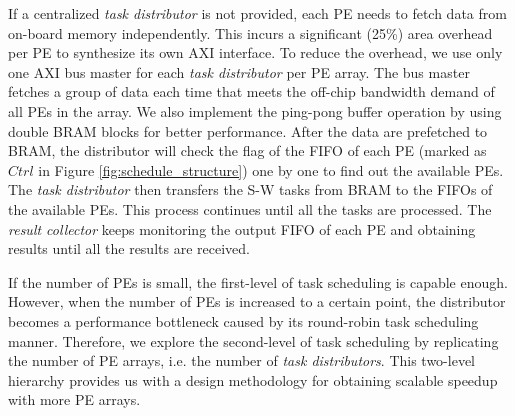 If a centralized \textit{task distributor} is not provided, each PE needs to fetch data from on-board memory independently. 
This incurs a significant (25\%) area overhead per PE to synthesize its own AXI interface. 
To reduce the overhead, we use only one AXI bus master for each \textit{task distributor} per PE array. 
The bus master fetches a group of data each time that meets the off-chip bandwidth demand of all PEs in the array. 
We also implement the ping-pong buffer operation by using double BRAM blocks for better performance. 
After the data are prefetched to BRAM, 
the distributor will check the flag of the FIFO of each PE (marked as $Ctrl$ in Figure \ref{fig:schedule_structure}) one by one to find out the available PEs. 
The \textit{task distributor} then transfers the S-W tasks from BRAM to the FIFOs of the available PEs. 
This process continues until all the tasks are processed.
The \textit{result collector} keeps monitoring the output FIFO of each PE and obtaining results until all the results are received.

If the number of PEs is small, the first-level of task scheduling is capable enough. 
However, when the number of PEs is increased to a certain point, 
the distributor becomes a performance bottleneck caused by its round-robin task scheduling manner.
Therefore, we explore the second-level of task scheduling by replicating the number of PE arrays, i.e. the number of \textit{task distributors}. 
This two-level hierarchy provides us with a design methodology for obtaining scalable speedup with more PE arrays.
